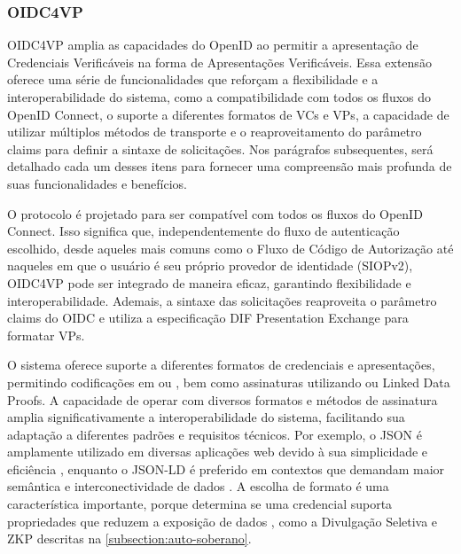 \subsubsection{OIDC4VP}\label{subsubsection:oidc4vp}

\acs{OIDC4VP} amplia as capacidades do OpenID ao permitir a apresentação de Credenciais Verificáveis na forma de Apresentações Verificáveis. Essa extensão oferece uma série de funcionalidades que reforçam a flexibilidade e a interoperabilidade do sistema, como a compatibilidade com todos os fluxos do OpenID Connect, o suporte a diferentes formatos de \acs{VC}s e \acs{VP}s, a capacidade de utilizar múltiplos métodos de transporte e o reaproveitamento do parâmetro claims para definir a sintaxe de solicitações. Nos parágrafos subsequentes, será detalhado cada um desses itens para fornecer uma compreensão mais profunda de suas funcionalidades e benefícios.

O protocolo é projetado para ser compatível com todos os fluxos do OpenID Connect. Isso significa que, independentemente do fluxo de autenticação escolhido, desde aqueles mais comuns como o Fluxo de Código de Autorização até naqueles em que o usuário é seu próprio provedor de identidade (\acs{SIOPv2}), \acs{OIDC4VP} pode ser integrado de maneira eficaz, garantindo flexibilidade e interoperabilidade.  Ademais, a sintaxe das solicitações reaproveita o parâmetro claims do \acs{OIDC} e utiliza a especificação DIF Presentation Exchange \cite{presentation-exchange} para formatar \acs{VP}s. 

O sistema oferece suporte a diferentes formatos de credenciais e apresentações, permitindo codificações em  ou , bem como assinaturas utilizando  ou Linked Data Proofs. A capacidade de operar com diversos formatos e métodos de assinatura amplia significativamente a interoperabilidade do sistema, facilitando sua adaptação a diferentes padrões e requisitos técnicos. Por exemplo, o \acs{JSON} é amplamente utilizado em diversas aplicações web devido à sua simplicidade e eficiência \cite{JSONrfc82592017}, enquanto o \acs{JSON-LD} é preferido em contextos que demandam maior semântica e interconectividade de dados \cite{jsonld112020}. A escolha de formato é uma característica importante, porque determina se uma credencial suporta propriedades que reduzem a exposição de dados \cite{OIDC4CI2023Authlete}, como a Divulgação Seletiva e \acs{ZKP} descritas na \autoref{subsection:auto-soberano}.


